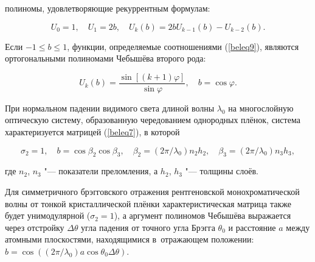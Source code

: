 полиномы, удовлетворяющие рекуррентным формулам:

\begin{equation}

	U_0=1,\quad  U_1=2b,\quad U_k(b)=2bU_{k-1}(b)-U_{k-2}(b). \label{beleq9}

\end{equation}



Если $-1\leq b\leq 1$, функции, определяемые соотношениями (\ref{beleq9}), являются ортогональными полиномами Чебышёва второго рода:

\begin{equation}

\label{beleq12}

U_k(b)=\frac{\sin[(k+1)\varphi]}{\sin\varphi}, \quad   b=\cos\varphi. 

\end{equation}



\begin{example}[1]При нормальном падении видимого света длиной волны $\lambda_0$ на многослойную оптическую систему, образованную чередованием однородных плёнок, система характеризуется матрицей (\ref{beleq7}), в которой 

$$

\sigma_2=1,\quad  b=\cos \beta_2\cos \beta_3,\quad  \beta_2=({2\pi}/{\lambda_0})n_2h_2,\quad  \beta_3=({2\pi}/{\lambda_0})n_3h_3,

$$

где $n_2$, $n_3$ "--- показатели преломления, а $h_2$, $h_3$ "--- толщины слоёв.

\end{example} 



\smallskip



\begin{example}[2]Для симметричного брэгговского отражения рентгеновской монохроматической волны от тонкой кристаллической плёнки характеристическая матрица также будет унимодулярной ($\sigma_2=1$), а аргумент полиномов Чебышёва выражается через отстройку $\Delta\theta$ угла падения от точного угла Брэгга $\theta_0$ и расстояние $a$ между атомными плоскостями, находящимися в~отражающем положении: $b=\cos\left(({2\pi}/{\lambda_0})a\cos\theta_0\Delta\theta\right)$.

\end{example} 



